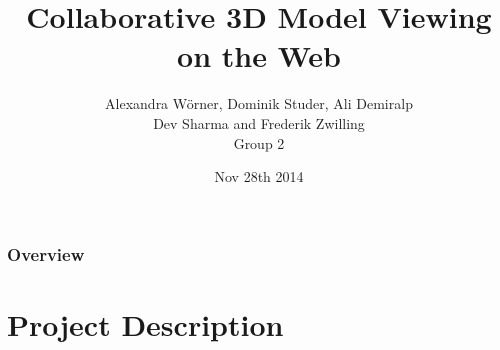 

\title[Collaborative 3D Model Viewing on the Web]{Collaborative 3D Model Viewing on the Web}
\author[Group 2]{%
  Alexandra Wörner, Dominik Studer, Ali Demiralp\\ Dev Sharma and Frederik Zwilling \\
  \bigskip
  {\scriptsize Group 2}
}

\date[Nov 28th 2014 @ HENM 2014]{Nov 28th 2014}



\frame[plain]{\titlepage}
\addtocounter{framenumber}{-1}

\begin{frame}
  \frametitle{Overview}
  \tableofcontents[hideallsubsections]
\end{frame}

\section{Project Description}

